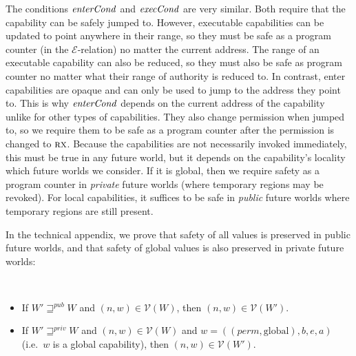\documentclass[format=acmsmall, review=true, screen=true]{acmart}
\newcommand{\var}[1]{\mathit{#1}}
\newcommand{\gl}{\var{g}}
\newcommand{\addr}{\var{a}}
\newcommand{\start}{\var{b}}
\newcommand{\addrend}{\var{e}}
\newcommand{\perm}{\var{perm}}
\newcommand{\stdcap}[1][(\perm,\gl)]{\left(#1,\start,\addrend,\addr \right)}
\newcommand{\plainfun}[2]{
  \ifthenelse{\equal{#2}{}}
  {\mathit{#1}}
  {\mathit{#1}(#2)}
}
\newcommand{\execCond}[1]{\plainfun{execCond}{#1}}
\newcommand{\entryCond}[1]{\plainfun{enterCond}{#1}}
\newcommand{\futurewk}{\mathbin{\sqsupseteq}^{\var{pub}}}
\newcommand{\futurestr}{\mathbin{\sqsupseteq}^{\var{priv}}}
\newcommand{\asmType}{\plaindom{AsmType}}
\newcommand{\plaindom}[1]{\mathrm{#1}}
\newcommand{\intr}[2]{\mathcal{#1}}
\newcommand{\valueintr}[1]{\intr{V}{#1}}
\newcommand{\exprintr}[1]{\intr{E}{#1}}
\newcommand{\stdvr}{\valueintr{\asmType}}
\newcommand{\stder}{\exprintr{\asmType}}
\newcommand{\npair}[2][n]{\left(#1,#2 \right)}
\newcommand{\plainperm}[1]{\textsc{#1}}
\newcommand{\exec}{\plainperm{rx}}
\newcommand{\plainlocality}[1]{\mathrm{#1}}
\newcommand{\glob}{\plainlocality{global}}
\newenvironment{toplas}{}{}
\newcommand{\itoplas}[1]{#1}
\begin{document}
The conditions $\entryCond{}$ and $\execCond{}$ are very similar. Both require
that the capability can be safely jumped to. However, executable capabilities
can be updated to point anywhere in their range, so they must be safe as a
program counter (in the $\stder$-relation) no matter the current address.
\itoplas{The range of an executable capability can also be reduced, so they must also be safe as program counter no matter what their range of authority is reduced to.}
In contrast, enter capabilities are opaque and can only be used to jump to the
address they point to.
%
\begin{toplas}%
  This is why $\entryCond{}$ depends on the current address of the capability unlike for other types of capabilities.
\end{toplas}
They also change permission when jumped to, so we require
them to be safe as a program counter after the permission is changed to $\exec$.
Because the capabilities are not necessarily invoked immediately, this must be
true in any future world, but it depends on the capability's locality which
future worlds we consider. If it is global, then we require safety as a program
counter in \emph{private} future worlds (where temporary regions may be
revoked). For local capabilities, it suffices to be safe in \emph{public} future
worlds where temporary regions are still present.

In the technical appendix, we prove that safety of all values is
preserved in public future worlds, and that safety of global values is
also preserved in private future worlds:
\begin{lemma}~
  \begin{itemize}
  \item If $W' \futurewk W$ and $\npair{w} \in \stdvr(W)$, then $\npair{w} \in
    \stdvr(W')$.
  \item If $W' \futurestr W$ and $\npair{w} \in \stdvr(W)$ and $w =
    \stdcap[(\perm,\glob)]$ (i.e.\ $w$ is a global capability), then $\npair{w}
    \in \stdvr(W')$.
  \end{itemize}
\end{lemma}
\end{document}
